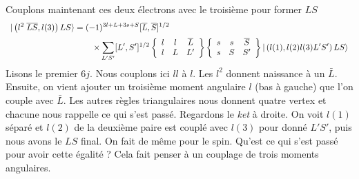 Couplons maintenant ces deux électrons avec le troisième pour former $LS$
\begin{equation}
\begin{array}{l}
\DS\vert \left( l^{2} \; \overline{L} \overline{S}, l (3) \right) 
L S \rangle 
= (-1)^{3l +L +3s +S} [ \overline{L} , \overline{S} ]^{1/2}\vspace{2mm}\\ \DS
\qquad\qquad\qquad\qquad\qquad\times  \sum_{L' S'} [ L', S' ]^{1/2} 
\left\{ 
\begin{array}{ccc}
l & l & \overline{L} \\
l & L & L'
\end{array}
\right\}
\left\{ 
\begin{array}{ccc}
s & s & \overline{S} \\
s & S & S'
\end{array}
\right\}
\vert \left( l(1), l(2) l(3)  L' S' \right) L S \rangle
\end{array}
\end{equation}
Lisons le premier $6j$. Nous couplons ici $ll$ à $l$. Les $l^2$ donnent naissance à un $\bar L$.
Ensuite, on vient ajouter un troisième moment angulaire $l$ (bas à gauche) que l'on couple
avec $\bar L$. Les autres règles triangulaires nous donnent quatre vertex et chacune nous rappelle
ce qui s'est passé. Regardons le \textit{ket} à droite. On voit $l(1)$ séparé et $l(2)$ de la
deuxième paire est couplé avec $l(3)$ pour donné $L'S'$, puis nous avons le $LS$ final. On 
fait de même pour le spin. Qu'est ce qui s'est passé pour avoir cette égalité ? Cela fait penser à un
 couplage de trois moments
angulaires. \\

